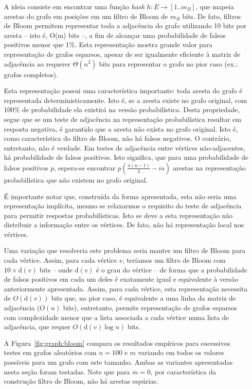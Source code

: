 A ideia consiste em encontrar uma função \emph{hash} $h: E \to [1..m_B]$, que mapeia arestas do grafo em posições em um filtro de Bloom de $m_B$ bits. De fato, filtros de Bloom permitem representar toda a adjacência do grafo utilizando 10 bits por aresta -- isto é, O(m) bits --, a fim de alcançar uma probabilidade de falsos positivos menor que 1\%. Esta representação mostra grande valor para representação de grafos esparsos, apesar de ser igualmente eficiente à matriz de adjacência ao requerer $\Theta(n^2)$ bits para representar o grafo no pior caso (ex.: grafos completos).

Esta representação possui uma característica importante: toda aresta do grafo é representada deterministicamente. Isto é, se a aresta existe no grafo original, com 100\% de probabilidade ela existirá na versão probabilística. Desta propriedade, segue que se um teste de adjacência na representação probabilística resultar em resposta negativa, é garantido que a aresta não exista no grafo original. Isto é, como característica do filtro de Bloom, não há falsos negativos. O contrário, entretanto, não é verdade. Em testes de adjacência entre vértices não-adjacentes, há probabilidade de falsos positivos. Isto significa, que para uma probabilidade de falsos positivos $p$, espera-se encontrar $p(\frac{n(n-1)}{2}-m)$ arestas na representação probabilística que não existem no grafo original.

É importante notar que, construída da forma apresentada, esta não seria uma representação implícita, mesmo se relaxarmos o requisito do teste de adjacência para permitir respostas probabilísticas. Isto se deve a esta representação não distribuir a informação entre os vértices. De fato, não há representação local nos vértices.

Uma variação que resolveria este problema seria manter um filtro de Bloom para cada vértice. Assim, para cada vértice $v$, teríamos um filtro de Bloom com $10 \times \text{d}(v)$ bits -- onde $\text{d}(v)$ é o grau do vértice -- de forma que a probabilidade de falsos positivos em cada um deles é exatamente igual e equivalente à versão anteriormente apresentada. Assim, para cada vértice, esta representação necessita de $O(\text{d}(v))$ bits que, no pior caso, é equivalente a uma linha da matriz de adjacência ($O(n)$ bits), entretanto, permite representação de grafos esparsos com complexidade menor que a lista associada a cada vértice numa lista de adjacência, que requer $O(\text{d}(v) \log n)$ bits.

A Figura~\ref{fig:graph:bloom} compara os resultados empíricos para sucessivos testes em grafos aleatórios com $n = 100$ e $m$ variando em todos os valores possíveis para um grafo com este tamanho. Ambas as variantes apresentadas nesta seção foram testadas. Note que para $m=0$, por característica da construção filtro de Bloom, não há arestas espúrias.

